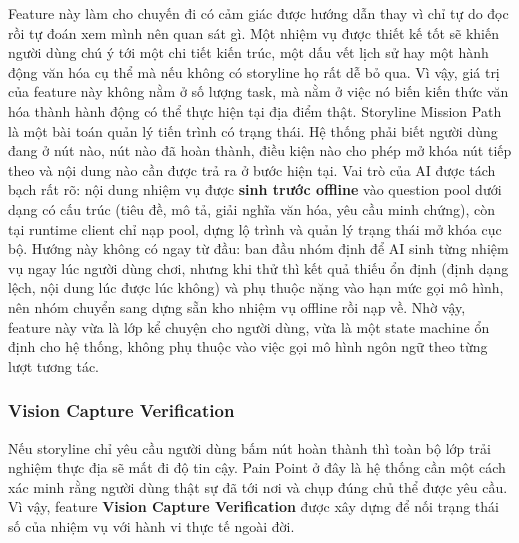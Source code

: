 Feature này làm cho chuyến đi có cảm giác được hướng dẫn
thay vì chỉ tự do đọc rồi tự đoán xem mình nên quan sát gì. Một nhiệm vụ
được thiết kế tốt sẽ khiến người dùng chú ý tới một chi tiết kiến trúc,
một dấu vết lịch sử hay một hành động văn hóa cụ thể mà nếu không có
storyline họ rất dễ bỏ qua. Vì vậy, giá trị của feature này không nằm ở
số lượng task, mà nằm ở việc nó biến kiến thức văn hóa thành hành động
có thể thực hiện tại địa điểm thật. Storyline Mission Path là một bài toán quản lý tiến
trình có trạng thái. Hệ thống phải biết người dùng đang ở nút nào, nút
nào đã hoàn thành, điều kiện nào cho phép mở khóa nút tiếp theo và nội
dung nào cần được trả ra ở bước hiện tại. Vai trò của AI được tách bạch
rất rõ: nội dung nhiệm vụ được \textbf{sinh trước offline} vào question
pool dưới dạng có cấu trúc (tiêu đề, mô tả, giải nghĩa văn hóa, yêu cầu
minh chứng), còn tại runtime client chỉ nạp pool, dựng lộ trình và quản
lý trạng thái mở khóa cục bộ. Hướng này không có ngay từ đầu: ban đầu
nhóm định để AI sinh từng nhiệm vụ ngay lúc người dùng chơi, nhưng khi
thử thì kết quả thiếu ổn định (định dạng lệch, nội dung lúc được lúc
không) và phụ thuộc nặng vào hạn mức gọi mô hình, nên nhóm chuyển sang
dựng sẵn kho nhiệm vụ offline rồi nạp về. Nhờ vậy, feature này vừa là lớp
kể chuyện cho người dùng, vừa là một state machine ổn định cho hệ thống,
không phụ thuộc vào việc gọi mô hình ngôn ngữ theo từng lượt tương tác.

\subsubsection{Vision Capture Verification}
\contrib

Nếu storyline chỉ yêu cầu người dùng bấm nút hoàn thành thì toàn bộ lớp
trải nghiệm thực địa sẽ mất đi độ tin cậy. Pain Point ở đây là hệ thống
cần một cách xác minh rằng người dùng thật sự đã tới nơi và chụp đúng
chủ thể được yêu cầu. Vì vậy, feature \textbf{Vision Capture
Verification} được xây dựng để nối trạng thái số của nhiệm vụ với hành
vi thực tế ngoài đời.

